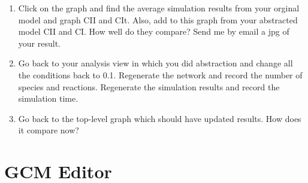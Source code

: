 \documentclass[titlepage,11pt]{article}
\begin{document}
\begin{enumerate}
\item Click on the graph and find the average simulation results from your
      orginal model and graph CII and CIt.  Also, add to this graph from
      your abstracted model CII and CI.  How well do they compare?  
      Send me by email a jpg of your result.

\item Go back to your analysis view in which you did abstraction and change
      all the conditions back to 0.1.  Regenerate the network and record the
      number of species and reactions.  Regenerate the simulation results and
      record the simulation time.  

\item Go back to the top-level graph which should have updated results.  
      How does it compare now?
\end{enumerate}

\section{GCM Editor}
\end{document}
